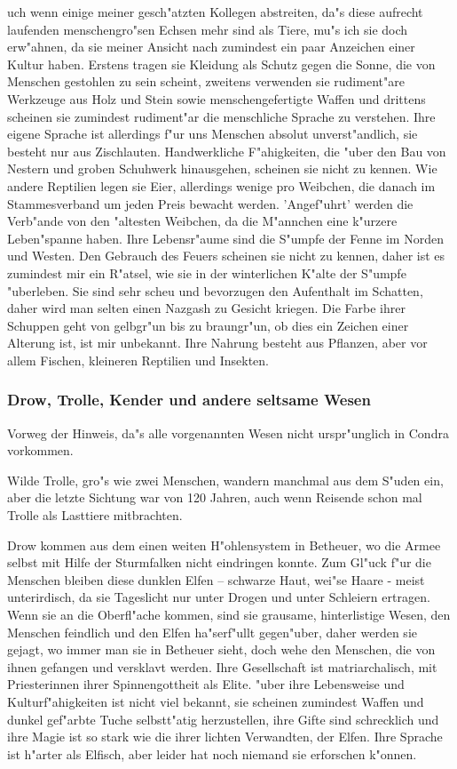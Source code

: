 \documentclass[a5paper,8pt]{book}
\begin{document}
uch wenn einige meiner gesch"atzten Kollegen abstreiten, da"s diese aufrecht laufenden menschengro"sen Echsen mehr sind als Tiere, mu"s ich sie doch erw"ahnen, da sie meiner Ansicht nach zumindest ein paar Anzeichen einer Kultur haben. Erstens tragen sie Kleidung als Schutz gegen die Sonne, die von Menschen gestohlen zu sein scheint, zweitens verwenden sie rudiment"are Werkzeuge aus Holz und Stein sowie menschengefertigte Waffen und drittens scheinen sie zumindest rudiment"ar die menschliche Sprache zu verstehen. Ihre eigene Sprache ist allerdings f"ur uns Menschen absolut unverst"andlich, sie besteht nur aus Zischlauten. Handwerkliche F"ahigkeiten, die "uber den Bau von Nestern und groben Schuhwerk hinausgehen, scheinen sie nicht zu kennen. Wie andere Reptilien legen sie Eier, allerdings wenige pro Weibchen, die danach im Stammesverband um jeden Preis bewacht werden. 'Angef"uhrt' werden die Verb"ande von den "altesten Weibchen, da die M"annchen eine k"urzere Leben"spanne haben. Ihre Lebensr"aume 
sind die S"umpfe der Fenne im Norden und Westen. Den Gebrauch des Feuers scheinen sie nicht zu kennen, daher ist es zumindest mir ein R"atsel, wie sie in der winterlichen K"alte der S"umpfe "uberleben. Sie sind sehr scheu und bevorzugen den Aufenthalt im Schatten, daher wird man selten einen Nazgash zu Gesicht kriegen. Die Farbe ihrer Schuppen geht von gelbgr"un bis zu braungr"un, ob dies ein Zeichen einer Alterung ist, ist mir unbekannt. Ihre Nahrung besteht aus Pflanzen, aber vor allem Fischen, kleineren Reptilien und Insekten. 

\newpage

\subsubsection{ Drow, Trolle, Kender und andere seltsame Wesen}

Vorweg der Hinweis, da"s alle vorgenannten Wesen nicht urspr"unglich in Condra vorkommen. 

Wilde Trolle, gro"s wie zwei Menschen, wandern manchmal aus dem S"uden ein, aber die letzte Sichtung war von 120 Jahren, auch wenn Reisende schon mal Trolle als Lasttiere mitbrachten. 

Drow kommen aus dem einen weiten H"ohlensystem in Betheuer, wo die Armee selbst mit Hilfe der Sturmfalken nicht eindringen konnte. Zum Gl"uck f"ur die Menschen bleiben diese dunklen Elfen – schwarze Haut, wei"se Haare - meist unterirdisch, da sie Tageslicht nur unter Drogen und unter Schleiern ertragen. Wenn sie an die Oberfl"ache kommen, sind sie grausame, hinterlistige Wesen, den Menschen feindlich und den Elfen ha"serf"ullt gegen"uber, daher werden sie gejagt, wo immer man sie in Betheuer sieht, doch wehe den Menschen, die von ihnen gefangen und versklavt werden. Ihre Gesellschaft ist matriarchalisch, mit Priesterinnen ihrer Spinnengottheit als Elite. "uber ihre Lebensweise und Kulturf"ahigkeiten ist nicht viel bekannt, sie scheinen zumindest Waffen und dunkel gef"arbte Tuche selbstt"atig herzustellen, ihre Gifte sind schrecklich und ihre Magie ist so stark wie die ihrer lichten Verwandten, der Elfen. Ihre Sprache ist h"arter als Elfisch, aber leider hat noch niemand sie erforschen k"onnen. 
\end{document}
